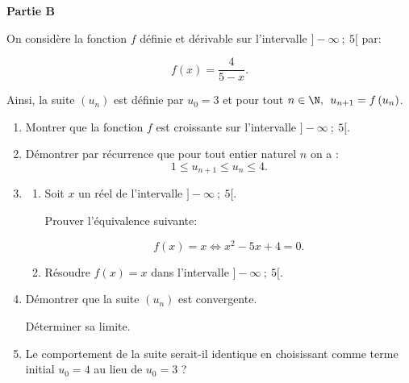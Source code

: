 \medskip

\textbf{Partie B}

\medskip

On considère la fonction $f$ définie et dérivable sur l'intervalle $] -\infty~;~5[$ par:

\[f(x) = \dfrac{4}{5 - x}.\]

Ainsi, la suite $\left(u_n\right)$ est définie par $u_0 = 3$ et pour tout $n \in \N,\:\: u_{n+1}  = f\left(u_n\right)$.

\medskip

\begin{enumerate}
\item Montrer que la fonction $f$ est croissante sur l'intervalle $]-\infty~;~5[$.
\item Démontrer par récurrence que pour tout entier naturel $n$ on a : 
\[1 \leqslant u_{n+1} \leqslant u_n \leqslant 4.\]
\item 
	\begin{enumerate}
		\item Soit $x$ un réel de l'intervalle $]-\infty~;~5[$.

Prouver l'équivalence suivante: 

\[f(x) = x \iff x^2 - 5x + 4 = 0.\]
		
		\item Résoudre $f(x) = x$ dans l'intervalle $]-\infty~;~5[$.
	\end{enumerate}	
\item Démontrer que la suite $\left(u_n\right)$ est convergente.

Déterminer sa limite.
\item Le comportement de la suite serait-il identique en choisissant comme terme initial $u_0 = 4$ au lieu de $u_0 = 3$ ?
\end{enumerate}
